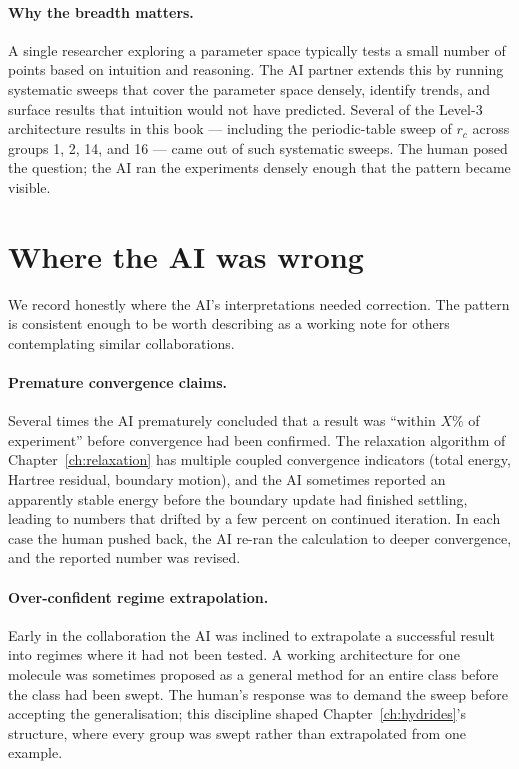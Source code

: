 \paragraph{Why the breadth matters.}
A single researcher exploring a parameter space typically tests a small number of points based on intuition and reasoning. The AI partner extends this by running systematic sweeps that cover the parameter space densely, identify trends, and surface results that intuition would not have predicted. Several of the Level-3 architecture results in this book --- including the periodic-table sweep of $r_c$ across groups 1, 2, 14, and 16 --- came out of such systematic sweeps. The human posed the question; the AI ran the experiments densely enough that the pattern became visible.

\section{Where the AI was wrong}\label{sec:where-wrong}

We record honestly where the AI's interpretations needed correction. The pattern is consistent enough to be worth describing as a working note for others contemplating similar collaborations.

\paragraph{Premature convergence claims.}
Several times the AI prematurely concluded that a result was ``within $X\%$ of experiment'' before convergence had been confirmed. The relaxation algorithm of Chapter~\ref{ch:relaxation} has multiple coupled convergence indicators (total energy, Hartree residual, boundary motion), and the AI sometimes reported an apparently stable energy before the boundary update had finished settling, leading to numbers that drifted by a few percent on continued iteration. In each case the human pushed back, the AI re-ran the calculation to deeper convergence, and the reported number was revised.

\paragraph{Over-confident regime extrapolation.}
Early in the collaboration the AI was inclined to extrapolate a successful result into regimes where it had not been tested. A working architecture for one molecule was sometimes proposed as a general method for an entire class before the class had been swept. The human's response was to demand the sweep before accepting the generalisation; this discipline shaped Chapter~\ref{ch:hydrides}'s structure, where every group was swept rather than extrapolated from one example.

